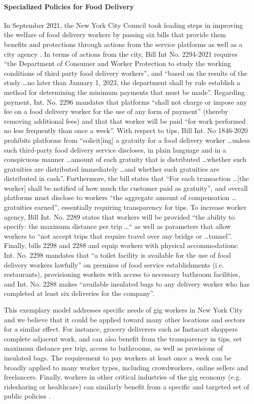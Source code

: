 \paragraph{Specialized Policies for Food Delivery}
In September 2021, the New York City Council took leading steps in improving the welfare of food delivery workers by passing six bills that provide them benefits and protections through actions from the service platforms as well as a city agency \cite{noauthor_2021-px}. In terms of actions from the city, Bill Int No. 2294-2021 requires ``the Department of Consumer and Worker Protection to study the working conditions of third party food delivery workers'', and ``based on the results of the study \dots no later than January 1, 2023, the department shall by rule establish a method for determining the minimum payments that must be made''. Regarding payment, Int. No. 2296 mandates that platforms ``shall not charge or impose any fee on a food delivery worker for the use of any form of payment'' (thereby removing additional fees) and that that worker will be paid ``for work performed no less frequently than once a week''. With respect to tips, Bill Int. No 1846-2020 prohibits platforms from ``solicit[ing] a gratuity for a food delivery worker \dots unless such third-party food delivery service discloses, in plain language and in a conspicuous manner \dots amount of each gratuity that is distributed \dots whether such gratuities are distributed immediately \dots and whether such gratuities are distributed in cash''. Furthermore, the bill states that ``For each transaction \dots [the worker] shall be notified of how much the customer paid as gratuity'', and overall platforms must disclose to workers ``the aggregate amount of compensation \dots gratuities earned'', essentially requiring transparency for tips. To increase worker agency, Bill Int. No. 2289 states that workers will be provided ``the ability to specify: the maximum distance per trip \dots`` as well as parameters that allow workers to ``not accept trips that require travel over any bridge or \dots tunnel''. Finally, bills 2298 and 2288 and equip workers with physical accommodations: Int. No. 2298 mandates that ``a toilet facility is available for the use of food delivery workers lawfully'' on premises of food service establishments (i.e. restaurants), provisioning workers with access to necessary bathroom facilities, and Int. No. 2288 makes ``available insulated bags to any delivery worker who has completed at least six deliveries for the company''.

This exemplary model addresses specific needs of gig workers in New York City and we believe that it could be applied toward many other locations and sectors for a similar effect. For instance, grocery deliverers such as Instacart shoppers complete adjacent work, and can also benefit from the transparency in tips, set maximum distance per trip, access to bathrooms, as well as provisions of insulated bags. The requirement to pay workers at least once a week can be broadly applied to many worker types, including crowdworkers, online sellers and freelancers. Finally, workers in other critical industries of the gig economy (e.g. ridesharing or healthcare) can similarly benefit from a specific and targeted set of public policies \cite{lobel2017gig}.

